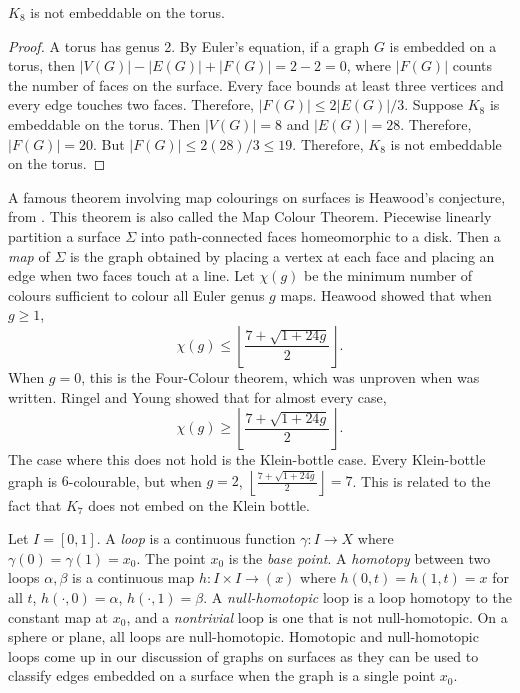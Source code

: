 \begin{proposition}
	$K_8$ is not embeddable on the torus.
\end{proposition}
\begin{proof}
	A torus has genus 2. By Euler's equation, if a graph $G$ is embedded on a torus, then $|V(G)| - |E(G)| + |F(G)| = 2 - 2 = 0$, where $|F(G)|$ counts the number of faces on the surface. Every face bounds at least three vertices and every edge touches two faces. Therefore, $|F(G)| \leq 2|E(G)|/3$. Suppose $K_8$ is embeddable on the torus. Then $|V(G)| = 8$ and $|E(G)| = 28$. Therefore, $|F(G)| = 20$. But $|F(G)| \leq 2 (28)/3 \leq 19$. Therefore, $K_8$ is not embeddable on the torus.
\end{proof}

A famous theorem involving map colourings on surfaces is Heawood's conjecture, from \textcite{heawoodMapcolourTheorem1890}. This theorem is also called the Map Colour Theorem. Piecewise linearly partition a surface $\Sigma$ into path-connected faces homeomorphic to a disk. Then a \textit{map} of $\Sigma$ is the graph obtained by placing a vertex at each face and placing an edge when two faces touch at a line. Let $\chi(g)$ be the minimum number of colours sufficient to colour all Euler genus $g$ maps. Heawood showed that when $g \geq 1$, 
	\begin{equation*}
		\chi(g) \leq \left\lfloor 
		\frac{7 + \sqrt{1 + 24g}}{2}
		\right\rfloor.
	\end{equation*}
When $g = 0$, this is the Four-Colour theorem, which was unproven when \textcite{ringelMapColorTheorem1974} was written.  
Ringel and Young \cite{ringelMapColorTheorem1974} showed that for almost every case,
\begin{equation*}
	\chi(g) \geq \left\lfloor 
	\frac{7 + \sqrt{1 + 24g}}{2}
	\right\rfloor.
\end{equation*}
The case where this does not hold is the Klein-bottle case. Every Klein-bottle graph is $6$-colourable, but when $g = 2$, $\left\lfloor 
\frac{7 + \sqrt{1 + 24g}}{2}
\right\rfloor = 7$. This is related to the fact that $K_7$ does not embed on the Klein bottle. 

Let $I = [0, 1]$.
A \textit{loop} is a continuous function $\gamma : I \rightarrow X$ where $\gamma(0) = \gamma(1) = x_0$. The point $x_0$ is the \textit{base point}. A \textit{homotopy} between two loops $\alpha, \beta$ is a continuous map $h : I \times I \rightarrow (x)$ where $h(0, t) = h(1, t) = x$ for all $t$, $h(\cdot, 0) = \alpha$, $h(\cdot, 1) = \beta$. A \textit{null-homotopic} loop is a loop homotopy to the constant map at $x_0$, and a \textit{nontrivial} loop is one that is not null-homotopic. On a sphere or plane, all loops are null-homotopic. Homotopic and null-homotopic loops come up in our discussion of graphs on surfaces as they can be used to classify edges embedded on a surface when the graph is a single point $x_0$. 
